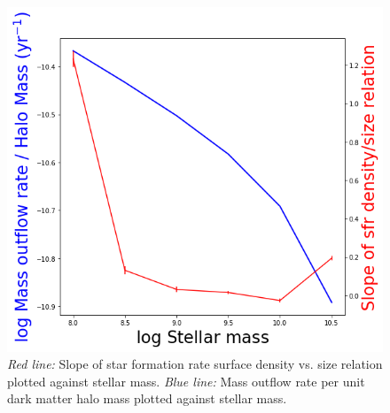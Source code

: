 \documentclass[iop]{emulateapj}
\begin{document}
\begin{figure}
	\centering
	\includegraphics[width=1. \columnwidth]{outflowrate_slope2.png}
	\caption{\textit{Red line:} Slope of star formation rate surface density vs. size relation plotted against stellar mass. \textit{Blue line:} Mass outflow rate per unit dark matter halo mass plotted against stellar mass.}
	\label{fig:outflow}
	
\end{figure}





\end{document}
